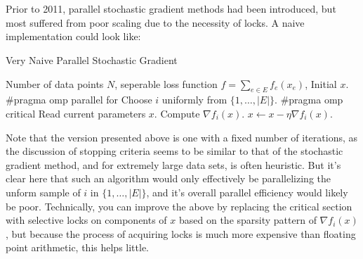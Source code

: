 \section{\hogwild}

Prior to 2011, parallel stochastic gradient methods had been introduced, but
most suffered from poor scaling due to the necessity of locks. A naive
implementation could look like:
\begin{breakablealgorithm}
  \caption{Very Naive Parallel Stochastic Gradient}
  \label{alg:naivePSG}
  \begin{algorithmic}[1]
    \Require Number of data points $N$, seperable loss function $f
    = \sum_{e \in E} f_e(x_e)$, Initial $x$.
      \State \#pragma omp parallel for
        \State Choose $i$ uniformly from $\{1, \dots, |E|\}$.
        \State \#pragma omp critical
        \Indent
          \State Read current parameters $x$.
          \State Compute $\nabla f_i(x)$.
          \State $x \gets x - \eta \nabla f_i(x)$.
        \EndIndent
      \EndFor
    \EndFor
  \end{algorithmic}
\end{breakablealgorithm}
Note that the version presented above is one with a fixed number of iterations,
as the discussion of stopping criteria seems to be similar to that of the
stochastic gradient method, and for extremely large data sets, is often
heuristic. But it's clear here that such an algorithm would only effectively be
parallelizing the unform sample of $i$ in $\{1, \dots, |E|\}$, and it's overall
parallel efficiency would likely be poor. Technically, you can improve the above
by replacing the critical section with selective locks on components of $x$
based on the sparsity pattern of $\nabla f_i(x)$, but because the process of
acquiring locks is much more expensive than floating point arithmetic, this
helps little.


